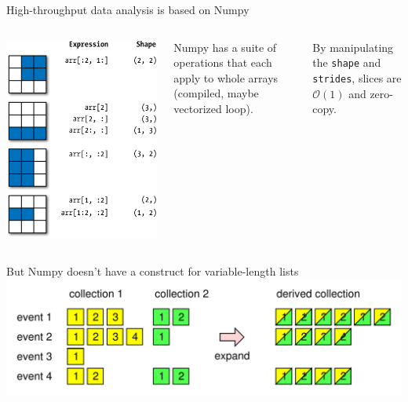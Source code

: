 \documentclass[aspectratio=169]{beamer}
\begin{document}
\begin{frame}{High-throughput data analysis is based on Numpy}
\Large
\vspace{0.5 cm}
\begin{columns}
\includegraphics[width=\linewidth]{numpy-slicing.png}

Numpy has a suite of operations that each apply to whole arrays (compiled, maybe vectorized loop).

\vspace{1 cm}

By manipulating the {\tt shape} and {\tt strides}, slices are $\mathcal{O}(1)$ and zero-copy.
\end{columns}
\end{frame}

\begin{frame}{But Numpy doesn't have a construct for variable-length lists}
\Large
\vspace{0.5 cm}
\includegraphics[width=\linewidth]{two-collections.pdf}

\vspace{0.5 cm}
\end{frame}


\begin{frame}{}
\end{frame}
\end{document}
